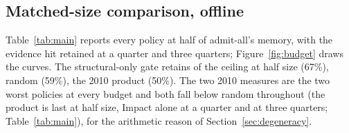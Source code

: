 \documentclass{ceurart}
\begin{document}
\subsection{Matched-size comparison, offline}
\label{sec:matched}
Table~\ref{tab:main} reports every policy at half of admit-all's memory, with the evidence hit retained at a quarter and three quarters; Figure~\ref{fig:budget} draws the curves. The structural-only gate retains \hitLcGraphGateStruct{} of the \hitLcAdmitAll{} ceiling at half size (67\%), random \hitLcRandom{} (59\%), the 2010 product \hitLcSivTen{} (50\%). The two 2010 measures are the two worst policies at every budget and both fall below random throughout (the product is last at half size, Impact alone at a quarter and at three quarters; Table~\ref{tab:main}), for the arithmetic reason of Section~\ref{sec:degeneracy}.
\end{document}
